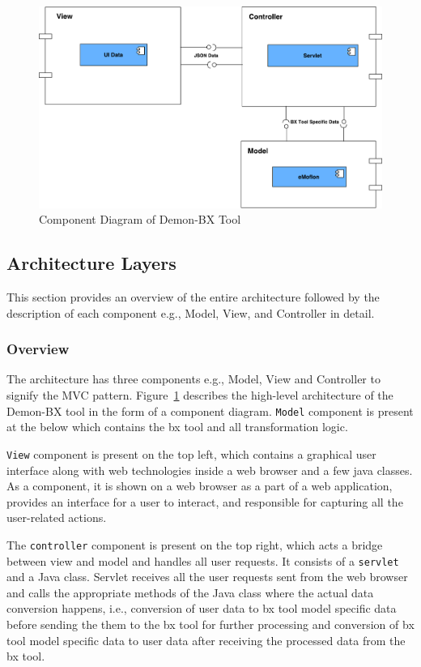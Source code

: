 \begin{figure}
	\includegraphics[width=1\textwidth]{figures/Component_Diagram-HighLevel}
	\caption{Component Diagram of Demon-BX Tool}
	\label{fig:Component_Diagram}
\end{figure}

\subsection{Architecture Layers}\label{subsec:design_layers}
This section provides an overview of the entire architecture followed by the description of each component e.g., Model, View, and Controller in detail.

\subsubsection{Overview}\label{subsubsec:design_overview}
The architecture has three components e.g., Model, View and Controller to signify the MVC pattern. Figure~\ref{fig:Component_Diagram} describes the high-level architecture of the Demon-BX tool in the form of a component diagram.   \texttt{Model} component is present at the below which contains the bx tool and all transformation logic.

\texttt{View} component is present on the top left, which contains a graphical user interface along with web technologies inside a web browser and a few java classes. As a component, it is shown on a web browser as a part of a web application, provides an interface for a user to interact, and responsible for capturing all the user-related actions.

The \texttt{controller} component is present on the top right, which acts a bridge between view and model and handles all user requests. It consists of a \texttt{servlet} and a Java class. Servlet receives all the user requests sent from the web browser and calls the appropriate methods of the Java class where the actual data conversion happens, i.e., conversion of user data to bx tool model specific data before sending the them to the bx tool for further processing and conversion of bx tool model specific data to user data after receiving the processed data from the bx tool.

